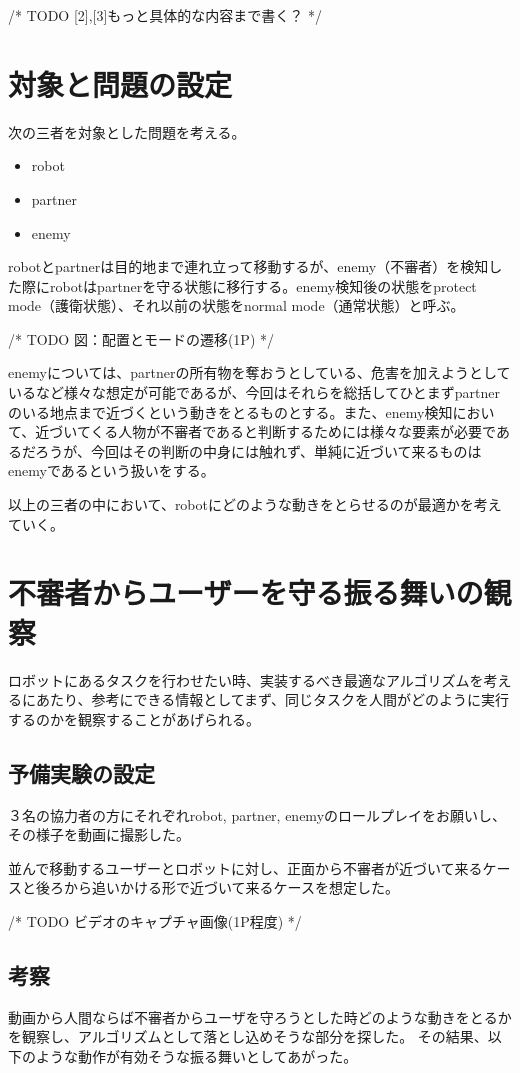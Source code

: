 \documentclass{kuthesis}
\begin{document}
/* TODO [2],[3]もっと具体的な内容まで書く？ */

\section{対象と問題の設定}
次の三者を対象とした問題を考える。

\begin{itemize}
	\item robot
	\item partner
	\item enemy
\end{itemize}

robotとpartnerは目的地まで連れ立って移動するが、enemy（不審者）を検知した際にrobotはpartnerを守る状態に移行する。enemy検知後の状態をprotect mode（護衛状態）、それ以前の状態をnormal mode（通常状態）と呼ぶ。

/* TODO 図：配置とモードの遷移(1P) */

enemyについては、partnerの所有物を奪おうとしている、危害を加えようとしているなど様々な想定が可能であるが、今回はそれらを総括してひとまずpartnerのいる地点まで近づくという動きをとるものとする。また、enemy検知において、近づいてくる人物が不審者であると判断するためには様々な要素が必要であるだろうが、今回はその判断の中身には触れず、単純に近づいて来るものはenemyであるという扱いをする。

以上の三者の中において、robotにどのような動きをとらせるのが最適かを考えていく。


\section{不審者からユーザーを守る振る舞いの観察}
ロボットにあるタスクを行わせたい時、実装するべき最適なアルゴリズムを考えるにあたり、参考にできる情報としてまず、同じタスクを人間がどのように実行するのかを観察することがあげられる。

\subsection{予備実験の設定}

３名の協力者の方にそれぞれrobot, partner, enemyのロールプレイをお願いし、その様子を動画に撮影した。

並んで移動するユーザーとロボットに対し、正面から不審者が近づいて来るケースと後ろから追いかける形で近づいて来るケースを想定した。

/* TODO ビデオのキャプチャ画像(1P程度) */

\subsection{考察}
動画から人間ならば不審者からユーザを守ろうとした時どのような動きをとるかを観察し、アルゴリズムとして落とし込めそうな部分を探した。
その結果、以下のような動作が有効そうな振る舞いとしてあがった。
\end{document}
